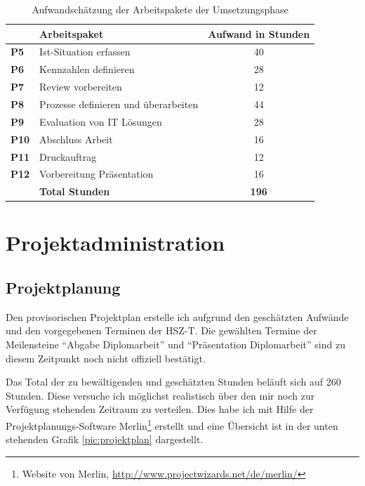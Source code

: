 \begin{table}[htbp]
\begin{center}
    \begin{tabular}{llc}
        \toprule & \textbf{Arbeitspaket} & \textbf{Aufwand in Stunden} \\
        \midrule \textbf{P5} & Ist-Situation erfassen & 40 \\
        \midrule \textbf{P6} & Kennzahlen definieren & 28 \\
        \midrule \textbf{P7} & Review vorbereiten & 12 \\
        \midrule \textbf{P8} & Prozesse definieren und überarbeiten & 44 \\
        \midrule \textbf{P9} & Evaluation von IT Lösungen & 28 \\
        \midrule \textbf{P10} & Abschluss Arbeit & 16 \\
        \midrule \textbf{P11} & Druckauftrag & 12 \\
        \midrule \textbf{P12} & Vorbereitung Präsentation & 16 \\
        \bottomrule & \textbf{Total Stunden} & \textbf{196} \\
        \bottomrule
    \end{tabular}
    \caption{Aufwandschätzung der Arbeitspakete der Umsetzungsphase}
    \label{tab:aufwand_umsetzungsphase}
\end{center}
\end{table}

\chapter{Projektadministration}
\section{Projektplanung}
Den provisorischen Projektplan erstelle ich aufgrund den geschätzten Aufwände
und den vorgegebenen Terminen der HSZ-T. Die gewählten Termine der Meilensteine
``Abgabe Diplomarbeit'' und ``Präsentation Diplomarbeit'' sind zu diesem Zeitpunkt
noch nicht offiziell bestätigt.

Das Total der zu bewältigenden und geschätzten Stunden beläuft sich 
auf 260 Stunden. Diese versuche ich möglichst realistisch über den mir noch
zur Verfügung stehenden Zeitraum zu verteilen. Dies habe ich mit Hilfe der 
Projektplanungs-Software Merlin\footnote{Website von Merlin, \url{http://www.projectwizards.net/de/merlin/}} 
erstellt und eine Übersicht ist in der unten stehenden Grafik \ref{pic:projektplan} 
dargestellt.


